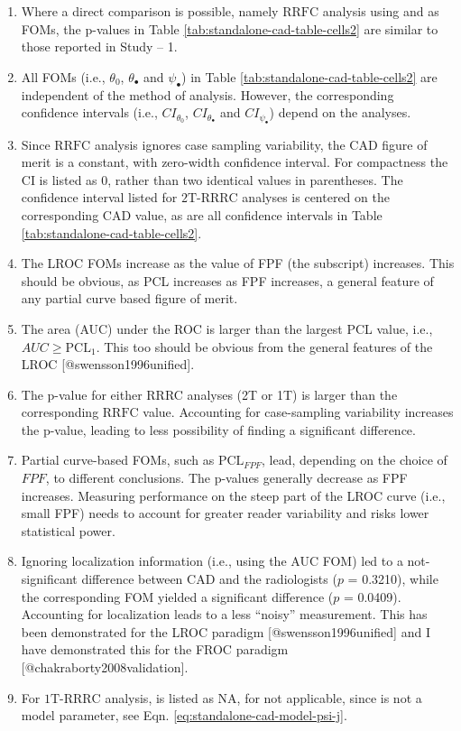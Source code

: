 \documentclass[
]{article}
\providecommand{\tightlist}{%
  \setlength{\itemsep}{0pt}\setlength{\parskip}{0pt}}
\begin{document}
\begin{enumerate}
\def\labelenumi{\arabic{enumi}.}
\tightlist
\item
  Where a direct comparison is possible, namely \(\text{RRFC}\) analysis using and as FOMs, the p-values in Table \ref{tab:standalone-cad-table-cells2} are similar to those reported in Study -- 1.
\item
  All FOMs (i.e., \(\theta_0\), \(\theta_{\bullet}\) and \(\psi_{\bullet}\)) in Table \ref{tab:standalone-cad-table-cells2} are independent of the method of analysis. However, the corresponding confidence intervals (i.e., \(CI_{\theta_0}\), \(CI_{\theta_{\bullet}}\) and \(CI_{\psi_{\bullet}}\)) depend on the analyses.
\item
  Since \(\text{RRFC}\) analysis ignores case sampling variability, the CAD figure of merit is a constant, with zero-width confidence interval. For compactness the CI is listed as 0, rather than two identical values in parentheses. The confidence interval listed for \(\text{2T-RRRC}\) analyses is centered on the corresponding CAD value, as are all confidence intervals in Table \ref{tab:standalone-cad-table-cells2}.
\item
  The LROC FOMs increase as the value of FPF (the subscript) increases.
  This should be obvious, as PCL increases as FPF increases, a general feature of any partial curve based figure of merit.
\item
  The area (AUC) under the ROC is larger than the largest PCL value, i.e., \(AUC \geq \text{PCL}_1\). This too should be obvious from the general features of the LROC {[}@swensson1996unified{]}.
\item
  The p-value for either RRRC analyses (2T or 1T) is larger than the corresponding \(\text{RRFC}\) value. Accounting for case-sampling variability increases the p-value, leading to less possibility of finding a significant difference.
\item
  Partial curve-based FOMs, such as \(\text{PCL}_{FPF}\), lead, depending on the choice of \(FPF\), to different conclusions. The p-values generally decrease as FPF increases. Measuring performance on the steep part of the LROC curve (i.e., small FPF) needs to account for greater reader variability and risks lower statistical power.
\item
  Ignoring localization information (i.e., using the AUC FOM) led to a not-significant difference between CAD and the radiologists (\(p\) = 0.3210), while the corresponding FOM yielded a significant difference (\(p\) = 0.0409). Accounting for localization leads to a less ``noisy'' measurement. This has been demonstrated for the LROC paradigm {[}@swensson1996unified{]} and I have demonstrated this for the FROC paradigm {[}@chakraborty2008validation{]}.
\item
  For \(\text{1T-RRRC}\) analysis, is listed as NA, for not applicable, since is not a model parameter, see Eqn. \eqref{eq:standalone-cad-model-psi-j}.
\end{enumerate}
\end{document}
